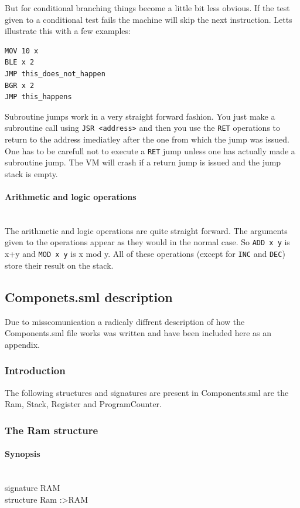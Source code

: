 \documentclass{article}
\newcommand{\V}{\verb}
\begin{document}
But for conditional branching things become a little bit less obvious. If the
test given to a conditional test fails the machine will skip the next
instruction. Letts illustrate this with a few examples:
\begin{verbatim}
MOV 10 x
BLE x 2
JMP this_does_not_happen
BGR x 2
JMP this_happens
\end{verbatim}

Subroutine jumps work in a very straight forward fashion. You just make a
subroutine call using \V+JSR <address>+ and then you use the \V+RET+ operations
to return to the address imediatley after the one from which the jump was
issued. One has to be carefull not to execute a \V+RET+ jump unless one has
actually made a subroutine jump. The VM will crash if a return jump is issued
and the jump stack is empty.

\paragraph{Arithmetic and logic operations} \
\\
The arithmetic and logic operations are quite straight forward. The arguments
given to the operations appear as they would in the normal case. So \V+ADD x y+
is x+y and \V+MOD x y+ is x mod y. All of these operations (except for \V+INC+
and \V+DEC+) store their result on the stack.




\subsection{Componets.sml description}
Due to misscomunication a radicaly diffrent description of how the
Components.sml file works was written and have been included here as an
appendix.
\subsubsection{Introduction}

The following structures and signatures are present in Components.sml are the
Ram, Stack, Register and ProgramCounter.

\subsubsection{The Ram structure}
\paragraph{Synopsis} \ 
\\
signature RAM\\
structure Ram :\textgreater RAM\\
\end{document}
